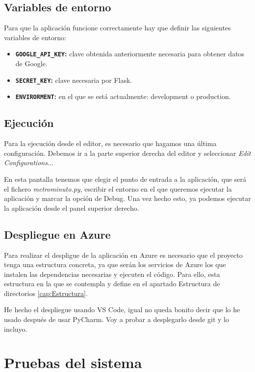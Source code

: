 \subsection{Variables de entorno}
Para que la aplicación funcione correctamente hay que definir las siguientes variables de entorno:
\begin{itemize}
	\item \textbf{\texttt{GOOGLE\_API\_KEY}:} clave obtenida anteriormente necesaria para obtener datos de Google.
	\item \textbf{\texttt{SECRET\_KEY}:} clave necesaria por Flask.
	\item \textbf{\texttt{ENVIRORMENT}:} en el que se está actualmente: development o production.
\end{itemize}

\subsection{Ejecución}
Para la ejecución desde el editor, es necesario que hagamos una última configuración. Debemos ir a la parte superior derecha del editor y seleccionar \textit{Edit Configurations$\dots$}

En esta pantalla tenemos que elegir el punto de entrada a la aplicación, que será el fichero \textit{metrominuto.py}, escribir el entorno en el que queremos ejecutar la aplicación y marcar la opción de Debug. Una vez hecho esto, ya podemos ejecutar la aplicación desde el panel superior derecho.

\subsection{Despliegue en Azure}
Para realizar el despligue de la aplicación en Azure es necesario que el proyecto tenga una estructura concreta, ya que serán los servicios de Azure los que instalen las dependencias necesarias y ejecuten el código. 
Para ello, esta estructura en la que se contempla y define en el apartado Estructura de directorios \ref{cap:Estructura}.

He hecho el despliegue usando VS Code, igual no queda bonito decir que lo he usado después de usar PyCharm. Voy a probar a desplegarlo desde git y lo incluyo. 

\section{Pruebas del sistema}
